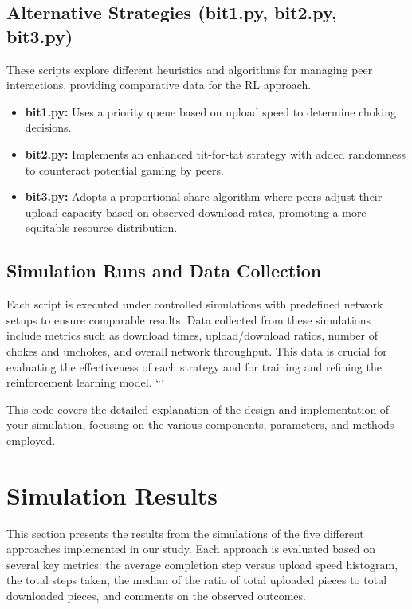 \documentclass{article}
\begin{document}
\subsection{Alternative Strategies (bit1.py, bit2.py, bit3.py)}
These scripts explore different heuristics and algorithms for managing peer interactions, providing comparative data for the RL approach.
\begin{itemize}
    \item \textbf{bit1.py:} Uses a priority queue based on upload speed to determine choking decisions.
    \item \textbf{bit2.py:} Implements an enhanced tit-for-tat strategy with added randomness to counteract potential gaming by peers.
    \item \textbf{bit3.py:} Adopts a proportional share algorithm where peers adjust their upload capacity based on observed download rates, promoting a more equitable resource distribution.
\end{itemize}

\subsection{Simulation Runs and Data Collection}
Each script is executed under controlled simulations with predefined network setups to ensure comparable results. Data collected from these simulations include metrics such as download times, upload/download ratios, number of chokes and unchokes, and overall network throughput. This data is crucial for evaluating the effectiveness of each strategy and for training and refining the reinforcement learning model.
```

This code covers the detailed explanation of the design and implementation of your simulation, focusing on the various components, parameters, and methods employed.

\newpage
\section{Simulation Results}
This section presents the results from the simulations of the five different approaches implemented in our study. Each approach is evaluated based on several key metrics: the average completion step versus upload speed histogram, the total steps taken, the median of the ratio of total uploaded pieces to total downloaded pieces, and comments on the observed outcomes.
\end{document}
